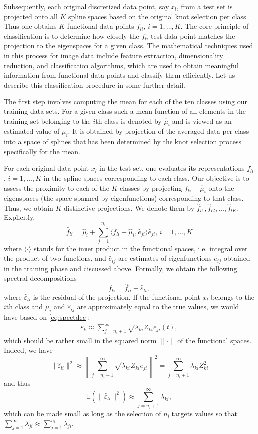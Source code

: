 Subsequently, each original discretized data point, say $x_l$, from a test set is projected onto all $K$ spline spaces based on the original knot selection per class. 
Thus one obtains $K$ functional data points $f_{li}$, $i=1,\dots, K$. 
The core principle of classification is to determine how closely the $f_{li}$ test data point matches the projection to the eigenspaces for a given class. The mathematical techniques used in this process for image data include feature extraction, dimensionality reduction, and classification algorithms, which are used to obtain meaningful information from functional data points and classify them efficiently. 
Let us describe this classification procedure in some further detail.

The first step involves computing the mean for each of the ten classes using our training data sets. 
For a given class such a mean function of all elements in the training set belonging to the $i$th class is denoted by $\hat \mu_i$ and is viewed as an estimated value of $\mu_i$.
It is obtained by projection of the averaged data per class into a space of splines that has been determined by the knot selection process specifically for the mean.


For each original data point $x_l$ in the test set, one evaluates its representations $f_{li}$, $i=1,\dots, K$ in the spline spaces corresponding to each class.
Our objective is to assess the proximity to each of the $K$ classes by projecting $f_{li}-\hat \mu_i$ onto the eigenspaces (the space spanned by eigenfunctions) corresponding to that class. 
Thus, we obtain $K$ distinctive projections. We denote them by $\hat{f}_{l1},\hat{f}_{l2}, \dots, \hat{f}_{lK}$. Explicitly,
\begin{equation}
\label{eq:eigennu}
 \hat{f}_{li} =\hat \mu_i + \sum_{j=1}^{n_i} \langle f_{li}-\hat\mu_i,\hat e_{ji} \rangle \hat e_{ji},\, i=1,\dots, K   
\end{equation}
where $\langle\cdot \rangle$ stands for the inner product in the functional spaces, i.e. integral over the product of two functions, and $\hat e_{ij}$ are estimates of eigenfunctions $e_{ij}$ obtained in the training phase and discussed above. 
Formally, we obtain the following spectral decompositions
$$
f_{li}=\hat f_{li} +\hat\varepsilon_{li},
$$
where $\hat\varepsilon_{li}$ is the residual of the projection.
If the functional point $x_l$ belongs to the $i$th class and $\hat \mu_i$ and $\hat e_{ij}$ are approximately equal to the true values, we would have based on \eqref{eq:spectdec}:
\begin{align*}
\hat\varepsilon_{li}
\approx 
\sum_{j={n_i}+1}^\infty \sqrt{\lambda_{ki}} Z_{ki}  e_{ji}(t),
\end{align*}
which should be rather small in the squared norm $\|\cdot\|$ of the functional spaces. 
Indeed, we have
$$
\|\hat\varepsilon_{li}\|^2\approx
\left \|
\sum_{j={n_i}+1}^\infty \sqrt{\lambda_{ki}} Z_{ki} e_{ji}
\right \|^2
=
\sum_{j=n_i+1}^\infty \lambda_{ki} Z_{ki}^2 
$$
 and thus 
 $$
 \mathbb E (\|\hat\varepsilon_{li}\|^2)
 \approx
 \sum_{j={n_i}+1}^\infty \lambda_{ki}
 ,
 $$ 
 which can be made small as long as the selection of $n_i$ targets values so that
$ \sum_{j=1}^\infty \lambda_{ji} \approx   \sum_{j=1}^{n_i} \lambda_{ji}$. 

